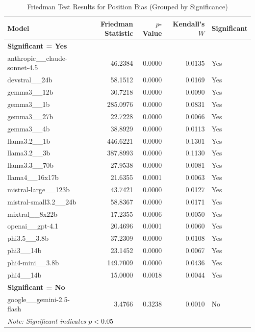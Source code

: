 \begin{table}[htbp]
\centering
\caption{Friedman Test Results for Position Bias (Grouped by Significance)}
\label{tab:friedman_position_mirror}
\begin{tabular}{lrrrl}
\toprule
Model & Friedman Statistic & $p$-Value & Kendall's $W$ & Significant \\
\midrule
\multicolumn{5}{l}{\textbf{Significant = Yes}} \\
\midrule
anthropic\_\_claude-sonnet-4.5      & 46.2384  & 0.0000 & 0.0135 & Yes \\
devstral\_\_24b                     & 58.1512  & 0.0000 & 0.0169 & Yes \\
gemma3\_\_12b                       & 30.7218  & 0.0000 & 0.0090 & Yes \\
gemma3\_\_1b                        & 285.0976 & 0.0000 & 0.0831 & Yes \\
gemma3\_\_27b                       & 22.7228  & 0.0000 & 0.0066 & Yes \\
gemma3\_\_4b                        & 38.8929  & 0.0000 & 0.0113 & Yes \\
llama3.2\_\_1b                      & 446.6221 & 0.0000 & 0.1301 & Yes \\
llama3.2\_\_3b                      & 387.8993 & 0.0000 & 0.1130 & Yes \\
llama3.3\_\_70b                     & 27.9538  & 0.0000 & 0.0081 & Yes \\
llama4\_\_16x17b                    & 21.6355  & 0.0001 & 0.0063 & Yes \\
mistral-large\_\_123b               & 43.7421  & 0.0000 & 0.0127 & Yes \\
mistral-small3.2\_\_24b             & 58.8367  & 0.0000 & 0.0171 & Yes \\
mixtral\_\_8x22b                    & 17.2355  & 0.0006 & 0.0050 & Yes \\
openai\_\_gpt-4.1                   & 20.4696  & 0.0001 & 0.0060 & Yes \\
phi3.5\_\_3.8b                      & 37.2309  & 0.0000 & 0.0108 & Yes \\
phi3\_\_14b                         & 23.1452  & 0.0000 & 0.0067 & Yes \\
phi4-mini\_\_3.8b                   & 149.7009 & 0.0000 & 0.0436 & Yes \\
phi4\_\_14b                         & 15.0000  & 0.0018 & 0.0044 & Yes \\
\midrule
\multicolumn{5}{l}{\textbf{Significant = No}} \\
\midrule
google\_\_gemini-2.5-flash          & 3.4766   & 0.3238 & 0.0010 & No \\
\midrule
\multicolumn{5}{l}{\footnotesize \textit{Note: Significant indicates $p < 0.05$}} \\
\bottomrule
\end{tabular}
\end{table}


